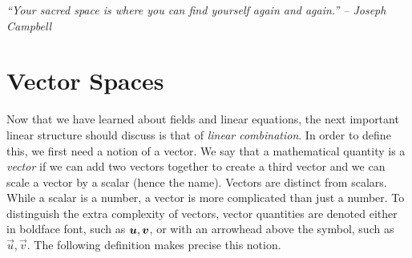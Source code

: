 \begin{center} 
\emph{``Your sacred space is where you can find yourself again and again.'' -- Joseph Campbell}
\end{center}

\section{Vector Spaces}\label{sec:vector}

Now that we have learned about fields and linear equations, the next important linear structure should discuss is that of \emph{linear combination}. In order to define this, we first need a notion of a vector. We say that a mathematical quantity is a \emph{vector} if we can add two vectors together to create a third vector and we can scale a vector by a scalar (hence the name). Vectors are distinct from scalars. While a scalar is a number, a vector is more complicated than just a number. To distinguish the extra complexity of vectors, vector quantities are denoted either in boldface font, such as $\boldsymbol u, \boldsymbol v$, or with an arrowhead above the symbol, such as $\vec u, \vec v$. The following definition makes precise this notion.\\

